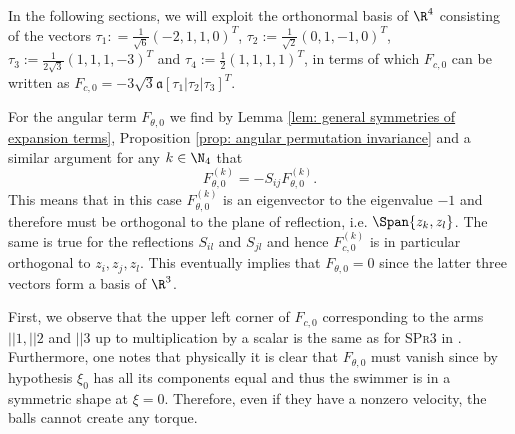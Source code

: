 In the following sections, we will exploit the orthonormal basis of $\R^4$ consisting of the vectors $\tau_1 : = \tfrac{1}{\sqrt{6}}(-2,1,1,0)^T$, $\tau_2 := \tfrac{1}{\sqrt{2}}(0,1,-1,0)^T$, $\tau_{3}:= \tfrac{1}{2 \sqrt{3}} (1,1,1,-3)^T$ and $\tau_4:= \tfrac{1}{2}(1,1,1,1)^T$, in terms of which $F_{c,0}$ can be written as $F_{c, 0} = -3 \sqrt{3} \mathfrak{a} [\tau_1|\tau_2| \tau_3 ]^T$.

For the angular term $F_{\theta,0}$ we find by Lemma \ref{lem: general symmetries of expansion terms}, Proposition \ref{prop: angular permutation invariance} and a similar argument for any $k \in \N_4$ that
\begin{equation}
F_{\theta, 0}^{(k)} = -S_{ij} F_{\theta, 0}^{(k)}.
\end{equation}
This means that in this case $F_{\theta,0}^{(k)}$ is an eigenvector to the eigenvalue $-1$ and therefore must be orthogonal to the plane of reflection, i.e. $\Span\{z_k, z_l\}$. The same is true for the reflections $S_{il}$ and $S_{jl}$ and hence $F_{c,0}^{(k)}$ is in particular orthogonal to $z_i, z_j, z_l$. This eventually implies that $ F_{\theta, 0} = 0$ since the latter three vectors form a basis of $\R^3$.

\begin{remark}
First, we observe that the upper left corner of $F_{c,0}$ corresponding to the arms $||1, ||2$ and $||3$ up to multiplication by a scalar is the same as for \textsc{SPr3} in \cite{Alouges2017}. Furthermore, one notes that physically it is  clear that $F_{\theta,0}$ must vanish since by hypothesis $\xi_0$ has all its components equal and thus the swimmer is in a symmetric shape at $\xi = 0$. Therefore, even if they have a nonzero velocity, the balls cannot create any torque.
\end{remark}



